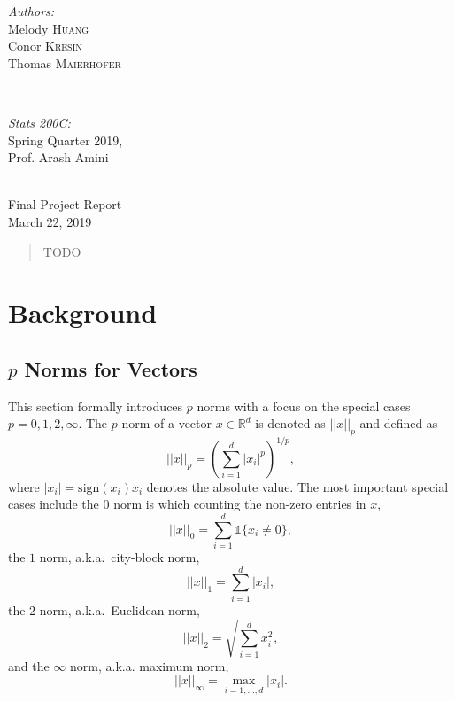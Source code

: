 \documentclass[12pt, twoside]{article}
\newcommand{\R}{\mathbb{R}}
\newcommand{\1}{\mathbb{1}}
\begin{document}
\begin{titlepage}
    	\hspace{1cm}
    \begin{minipage}{0.4\textwidth}
    \begin{flushleft} \large
    \emph{Authors:}\\
        Melody \textsc{Huang} \\
        Conor \textsc{Kresin} \\
        Thomas \textsc{Maierhofer} %
    \end{flushleft}
    \end{minipage}
    ~
    \begin{minipage}{0.4\textwidth}
    \begin{flushright} \large
    \emph{Stats 200C:} \\
    Spring Quarter 2019, \\
    Prof. Arash Amini \\ %
    \text{ }
    \end{flushright}
    \end{minipage}\\[2cm]
    
    \large{
    Final Project Report
    } \\[2cm]
    
    {\large March 22, 2019}\\[2cm] %


    \vfill %

\end{titlepage}


\tableofcontents 
\clearpage

\begin{abstract}
TODO
\end{abstract}
\clearpage
{}

\section{Background}

\subsection{$p$ Norms for Vectors}
This section formally introduces $p$ norms with a focus on the special cases $ p = 0, 1, 2, \infty$.
The $p$ norm of a vector $x \in \R^d$ is denoted as $||x||_p$ and defined as
$$||x||_p = \left(\sum_{i = 1}^d |x_i|^p \right)^{1/p},$$
where $|x_i| = \text{sign}(x_i)x_i$ denotes the absolute value.
%
The most important special cases include the $0$ norm is which counting the non-zero entries in $x$,
$$||x||_0 = \sum_{i = 1}^d \1\{x_i \neq 0\},$$
the $1$ norm, a.k.a.\ city-block norm,
$$||x||_1 = \sum_{i = 1}^d |x_i|,$$
the $2$ norm, a.k.a.\ Euclidean norm,
$$||x||_2 = \sqrt{\sum_{i = 1}^d x_i^2},$$
and the $\infty$ norm, a.k.a. maximum norm,
$$||x||_\infty = \max_{i = 1, \ldots, d} |x_i|.$$
\end{document}
